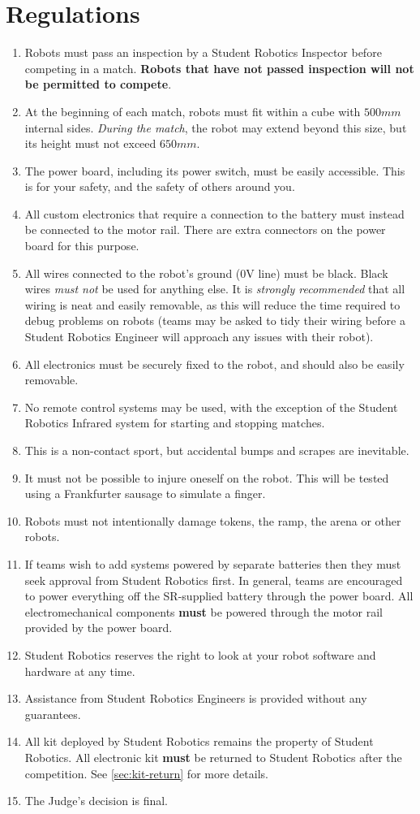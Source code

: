 \section {Regulations}
\label{sec:Regulations}

\begin{enumerate}
\item Robots must pass an inspection by a Student Robotics Inspector before competing in a match.
 \textbf{Robots that have not passed inspection will not be permitted to compete}.
\item At the beginning of each match, robots must fit within a cube with $500mm$ internal sides.  \textit{During the match}, the robot may extend beyond this size, but its height must not exceed $650mm$.
\item The power board, including its power switch, must be easily accessible.
 This is for your safety, and the safety of others around you.
\item All custom electronics that require a connection to the battery must instead be connected to the motor rail.
 There are extra connectors on the power board for this purpose.
\item All wires connected to the robot's ground (0V line) must be black.
 Black wires \emph{must not} be used for anything else.
 It is \emph{strongly recommended} that all wiring is neat and easily removable, as this will reduce the time required to debug problems on robots
  (teams may be asked to tidy their wiring before a Student Robotics Engineer will approach any issues with their robot).
\item All electronics must be securely fixed to the robot, and should also be easily removable.
\item No remote control systems may be used, with the exception of the Student Robotics Infrared system for starting and stopping matches.
\item This is a non-contact sport, but accidental bumps and scrapes are inevitable.
\item It must not be possible to injure oneself on the robot.
 This will be tested using a Frankfurter sausage to simulate a finger.
\item Robots must not intentionally damage tokens, the ramp, the arena or other robots.
\item If teams wish to add systems powered by separate batteries then they must seek approval from Student Robotics first.
 In general, teams are encouraged to power everything off the SR-supplied battery through the power board.
 All electromechanical components \textbf{must} be powered through the motor rail provided by the power board.
\item Student Robotics reserves the right to look at your robot software and hardware at any time.
\item Assistance from Student Robotics Engineers is provided without any guarantees.
\item All kit deployed by Student Robotics remains the property of Student Robotics.
 All electronic kit \textbf{must} be returned to Student Robotics after the competition. See \autoref{sec:kit-return} for more details.
\item The Judge's decision is final.


\end{enumerate}
